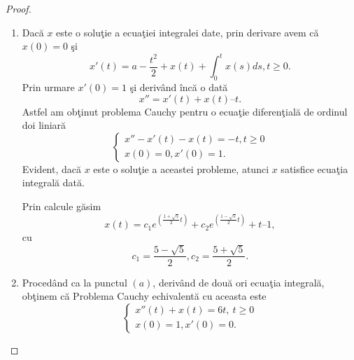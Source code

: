 \documentclass[a4paper,12pt,oneside]{report}
\begin{document}
\begin{proof}
\begin{enumerate}[label=(\alph*)]
\item  Dac\u{a} \(x\) este o solu\c{t}ie a ecua\c{t}iei integralei date, prin derivare avem c\u{a}  \(x\left ( 0 \right ) = 0\) \c{s}i
\begin{displaymath}
{x}'\left ( t \right ) = a - \frac{t^{2}}{2} + x\left ( t \right ) + \int_{0}^{t}x\left ( s \right )ds, t\geq 0.
\end{displaymath}
Prin urmare \({x}'\left ( 0 \right ) = 1\) \c{s}i deriv\^{a}nd \^{i}nc\u{a} o dat\u{a}
\begin{displaymath}
{x}'' = {x}' \left (t  \right ) + x\left ( t \right ) – t.
\end{displaymath}
Astfel am ob\c{t}inut problema Cauchy pentru o ecua\c{t}ie diferen\c{t}ial\u{a} de ordinul doi liniar\u{a}
\begin{displaymath}
\left\{\begin{matrix}
{x}'' - {x}'\left ( t \right ) - x\left ( t \right ) = -t, t\geq 0\\
x\left ( 0 \right ) = 0, {x}'\left ( 0 \right ) = 1.
\end{matrix}\right.
\end{displaymath}
Evident, dac\u{a} \(x\) este o solu\c{t}ie a aceastei probleme, atunci \(x\) satisfice ecua\c{t}ia integral\u{a} dat\u{a}.

\noindent Prin calcule g\u{a}sim
\begin{displaymath}
x\left ( t \right ) = c_{1}e^{\left (\frac{ 1 + \sqrt{5}}{2}t \right )}+ c_{2}e^{\left ( \frac{1-\sqrt{5}}{2}t \right )} + t – 1,
\end{displaymath}
cu
\begin{displaymath}
c_{1} = \frac{5 - \sqrt{5}}{2}, c_{2} = \frac{5 + \sqrt{5}}{2}.
\end{displaymath}

\item Proced\^{a}nd ca la punctul $(a)$, deriv\^{a}nd de dou\u{a} ori ecua\c{t}ia integral\u{a}, ob\c{t}inem c\u{a} Problema Cauchy echivalent\u{a} cu aceasta este
\begin{displaymath}
        	\left\{\begin{matrix}
        	{x}''\left ( t \right ) + x\left ( t \right ) = 6t,~ t\geq 0\\
        	x\left ( 0 \right ) = 1, {x}'\left ( 0 \right ) = 0.
        	\end{matrix}\right.
        \end{displaymath}


\end{enumerate}
\end{proof}
\end{document}

